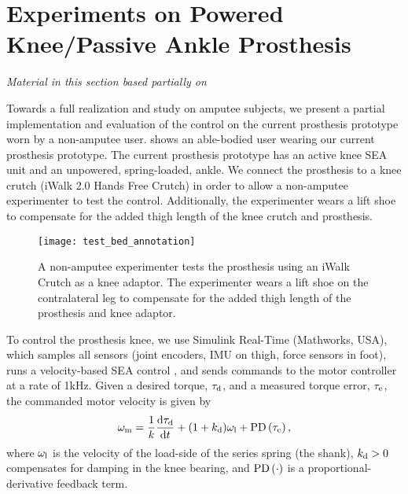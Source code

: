 \section{Experiments on Powered Knee/Passive Ankle
Prosthesis}\label{sec:complete_exp} 

\emph{Material in this section based partially on
\citet{thatte2016toward}\cite{thatte2016toward}}
\linebreak

Towards a full realization and study on amputee subjects, we present a partial
implementation and evaluation of the control on the current prosthesis prototype
worn by a non-amputee user.  shows an able-bodied
user wearing our current prosthesis prototype. The current prosthesis prototype
has an active knee SEA unit and an unpowered, spring-loaded, ankle.  We connect
the prosthesis to a knee crutch (iWalk 2.0 Hands Free Crutch) in order to allow
a non-amputee experimenter to test the control. Additionally, the experimenter
wears a lift shoe to compensate for the added thigh length of the knee crutch
and prosthesis.
\begin{figure}
    \centering 
    \texttt{[image: test\_bed\_annotation]}
    \caption{A non-amputee experimenter tests the prosthesis using an iWalk
    Crutch as a knee adaptor. The experimenter wears a lift shoe on the
    contralateral leg to compensate for the added thigh length of the prosthesis
    and knee adaptor.
    }\label{fig:test_bed_annotation}
\end{figure}

To control the prosthesis knee, we use Simulink Real-Time (Mathworks, USA),
which samples all sensors (joint encoders, IMU on thigh, force sensors in foot),
runs a velocity-based SEA control \citep{schepelmann2012development}, and sends
commands to the motor controller at a rate of 1kHz. Given a desired torque,
$\tau_{\mathrm{d}}$, and a measured torque error, $\tau_{\mathrm{e}}$, the commanded motor
velocity is given by
\begin{align}
    \omega_\tn{m} = \frac{1}{k} \frac{\tn{d} \tau_\tn{d}}{\tn{d} t} 
        + (1 + k_\tn{d})\omega_\tn{l} + \func{PD}{\tau_\tn{e}},
    \label{eq:velocity_based_sea}
\end{align}
where $\omega_{\mathrm{l}}$ is the velocity of the load-side of the series spring (the
shank), $k_{\mathrm{d}}>0$ compensates for damping in the knee bearing, and
$\func{PD}{\cdot}$ is a proportional-derivative feedback term. 

